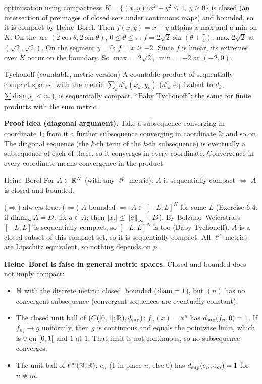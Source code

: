 \begin{example}{optimisation using compactness}
$K=\{(x,y):x^2+y^2\le4,\ y\ge0\}$ is closed (an intersection of preimages of closed sets under
continuous maps) and bounded, so it is compact by Heine--Borel. Then $f(x,y)=x+y$ attains a max
and a min on $K$. On the arc $(2\cos\theta,2\sin\theta)$, $0\le\theta\le\pi$:
$f=2\sqrt2\sin(\theta+\frac\pi4)$, max $2\sqrt2$ at $(\sqrt2,\sqrt2)$. On the segment $y=0$:
$f=x\ge-2$. Since $f$ is linear, its extremes over $K$ occur on the boundary. So $\max=2\sqrt2$,
$\min=-2$ at $(-2,0)$.
\end{example}

\begin{thm}{Tychonoff (countable, metric version)}
A countable product of sequentially compact spaces, with the metric
$\sum_k d'_k(x_k,y_k)$ ($d'_k$ equivalent to $d_k$, $\sum\operatorname{diam}_{d'_k}<\infty$), is sequentially
compact. ``Baby Tychonoff'': the same for finite products with the sum metric.
\end{thm}
\textbf{Proof idea (diagonal argument).} Take a subsequence converging in coordinate $1$; from it
a further subsequence converging in coordinate $2$; and so on. The diagonal sequence (the $k$-th
term of the $k$-th subsequence) is eventually a subsequence of each of these, so it converges in
every coordinate. Convergence in every coordinate means convergence in the product.

\begin{thm}{Heine--Borel}
For $A\subset\mathbb R^N$ (with any $\ell^p$ metric): $A$ is sequentially compact $\iff$ $A$ is closed
and bounded.
\end{thm}
\begin{answer}
($\Rightarrow$) always true. ($\Leftarrow$) $A$ bounded $\Rightarrow$ $A\subset[-L,L]^N$ for some
$L$ (Exercise 6.4: if $\operatorname{diam}_\infty A=D$, fix $a\in A$; then $|x_i|\le\left\lVert a\right\rVert_\infty+D$). By
Bolzano--Weierstrass $[-L,L]$ is sequentially compact, so $[-L,L]^N$ is too (Baby Tychonoff). $A$
is a closed subset of this compact set, so it is sequentially compact. All $\ell^p$ metrics are
Lipschitz equivalent, so nothing depends on $p$.
\end{answer}

\begin{tip}
\textbf{Heine--Borel is false in general metric spaces.} Closed and bounded does not imply
compact:
\begin{itemize}
\item $\mathbb N$ with the discrete metric: closed, bounded ($\operatorname{diam}=1$), but $(n)$ has no convergent
  subsequence (convergent sequences are eventually constant).
\item The closed unit ball of $(C([0,1];\mathbb R),d_{\sup})$: $f_n(x)=x^n$ has $d_{\sup}(f_n,0)=1$. If
  $f_{n_k}\to g$ uniformly, then $g$ is continuous and equals the pointwise limit, which is
  $0$ on $\mathopen{[}0,1\mathclose{[}$ and $1$ at $1$. That limit is not continuous, so no subsequence converges.
\item The unit ball of $\ell^\infty(\mathbb N;\mathbb R)$: $e_n$ (1 in place $n$, else 0) has
  $d_{\sup}(e_n,e_m)=1$ for $n\ne m$.
\end{itemize}
\end{tip}

